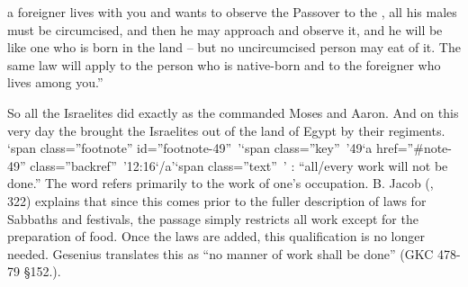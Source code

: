 {a foreigner
lives
with
you and wants to observe
the Passover
to the
{}, all
his males
must be circumcised,
and then
he may approach
and observe
it, and he will be
like one who is born
in the land –
but no
uncircumcised person
may eat of it.
The same law
will
apply to the person who is native-born
and to the foreigner
who lives
among you.”
\par }{\PP {}So
all
the Israelites
did
exactly
as the
{}
commanded
Moses
and Aaron.
And on this
very
day
the {}
brought
the Israelites
out of the land
of Egypt
by
their regiments. ‘span class=”footnote” id=”footnote-49” ’‘span class=”key” ’49‘a href=”\#note-49” class=”backref” ’12:16‘/a’‘span class=”text” ’
{}:
{} “all/every work will not be done.” The word refers primarily to the work of one’s occupation. B. Jacob ({}, 322) explains that since this comes prior to the fuller description of laws for Sabbaths and festivals, the passage simply restricts all work except for the preparation of food. Once the laws are added, this qualification is no longer needed. Gesenius translates this as “no manner of work shall be done” (GKC 478-79 §152.{}).

}
